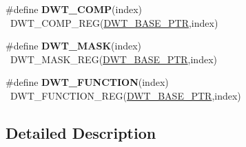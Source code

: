 \begin{DoxyCompactItemize}
\item 
\hypertarget{group___d_w_t___register___accessor___macros_ga8cd13337dbf7cec23c7f8c3621860e9e}{}\#define {\bfseries D\+W\+T\+\_\+\+C\+O\+M\+P}(index)                                                ~D\+W\+T\+\_\+\+C\+O\+M\+P\+\_\+\+R\+E\+G(\hyperlink{group___d_w_t___peripheral_ga3b46dfb2ea7946c6938028d879c82cb1}{D\+W\+T\+\_\+\+B\+A\+S\+E\+\_\+\+P\+T\+R},index)\label{group___d_w_t___register___accessor___macros_ga8cd13337dbf7cec23c7f8c3621860e9e}

\item 
\hypertarget{group___d_w_t___register___accessor___macros_ga293560983db73f0a6acead2a597fe349}{}\#define {\bfseries D\+W\+T\+\_\+\+M\+A\+S\+K}(index)                                                ~D\+W\+T\+\_\+\+M\+A\+S\+K\+\_\+\+R\+E\+G(\hyperlink{group___d_w_t___peripheral_ga3b46dfb2ea7946c6938028d879c82cb1}{D\+W\+T\+\_\+\+B\+A\+S\+E\+\_\+\+P\+T\+R},index)\label{group___d_w_t___register___accessor___macros_ga293560983db73f0a6acead2a597fe349}

\item 
\hypertarget{group___d_w_t___register___accessor___macros_ga6fc901c7f1391678b4058358fd39b877}{}\#define {\bfseries D\+W\+T\+\_\+\+F\+U\+N\+C\+T\+I\+O\+N}(index)                                        ~D\+W\+T\+\_\+\+F\+U\+N\+C\+T\+I\+O\+N\+\_\+\+R\+E\+G(\hyperlink{group___d_w_t___peripheral_ga3b46dfb2ea7946c6938028d879c82cb1}{D\+W\+T\+\_\+\+B\+A\+S\+E\+\_\+\+P\+T\+R},index)\label{group___d_w_t___register___accessor___macros_ga6fc901c7f1391678b4058358fd39b877}

\end{DoxyCompactItemize}


\subsection{Detailed Description}
